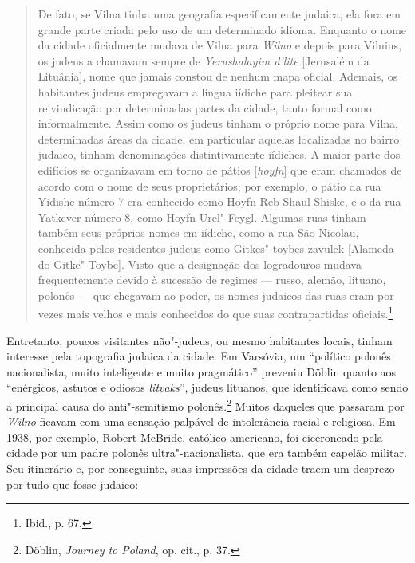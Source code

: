 \begin{quote}
De fato, se Vilna tinha uma geografia especificamente judaica, ela fora
em grande parte criada pelo uso de um determinado idioma. Enquanto o
nome da cidade oficialmente mudava de Vilna para \textit{Wilno} e depois para
Vilnius, os judeus a chamavam sempre de \textit{Yerushalayim d'lite}
{[}Jerusalém da Lituânia{]}, nome que jamais constou de nenhum mapa
oficial. Ademais, os habitantes judeus empregavam a língua iídiche para
pleitear sua reivindicação por determinadas partes da cidade, tanto
formal como informalmente. Assim como os judeus tinham o próprio nome
para Vilna, determinadas áreas da cidade, em particular aquelas
localizadas no bairro judaico, tinham denominações distintivamente
iídiches. A maior parte dos edifícios se organizavam em torno de pátios
{[}\textit{hoyfn}{]} que eram chamados de acordo com o nome de seus
proprietários; por exemplo, o pátio da rua Yidishe número 7 era
conhecido como Hoyfn Reb Shaul Shiske, e o da rua Yatkever número 8,
como Hoyfn Urel"-Feygl. Algumas ruas tinham também seus próprios nomes em
iídiche, como a rua São Nicolau, conhecida pelos residentes judeus como
Gitkes"-toybes zavulek {[}Alameda do Gitke"-Toybe{]}. Visto que a
designação dos logradouros mudava frequentemente devido à sucessão de
regimes --- russo, alemão, lituano, polonês --- que chegavam ao poder, os
nomes judaicos das ruas eram por vezes mais velhos e mais conhecidos do
que suas contrapartidas oficiais.\footnote{Ibid., p. 67.}
\end{quote}

Entretanto, poucos visitantes não"-judeus, ou mesmo habitantes locais,
tinham interesse pela topografia judaica da cidade. Em Varsóvia, um
``político polonês nacionalista, muito inteligente e muito pragmático''
preveniu Döblin quanto aos ``enérgicos, astutos e odiosos \textit{litvaks}'', 
judeus lituanos, que identificava como sendo a principal causa do
anti"-semitismo polonês.\footnote{Döblin, \textit{Journey to Poland}, op. cit., p. 37.} Muitos daqueles que passaram por \textit{Wilno} ficavam com uma sensação palpável de intolerância racial e religiosa. Em 1938, por
exemplo, Robert McBride, católico americano, foi ciceroneado pela cidade
por um padre polonês ultra"-nacionalista, que era também capelão militar.
Seu itinerário e, por conseguinte, suas impressões da cidade traem um
desprezo por tudo que fosse judaico:


